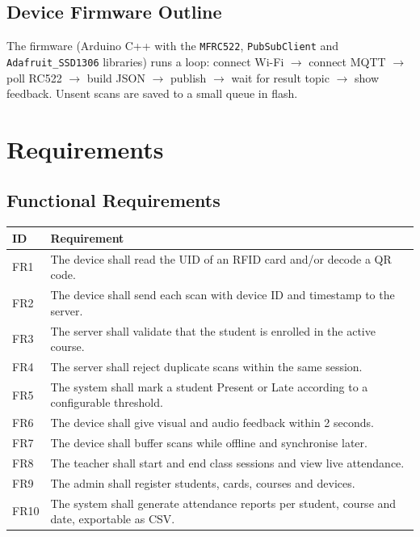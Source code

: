 \documentclass[11pt,a4paper]{article}
\begin{document}
\subsection{Device Firmware Outline}
The firmware (Arduino C++ with the \texttt{MFRC522}, \texttt{PubSubClient} and \texttt{Adafruit\_SSD1306} libraries) runs a loop: connect Wi-Fi $\rightarrow$ connect MQTT $\rightarrow$ poll RC522 $\rightarrow$ build JSON $\rightarrow$ publish $\rightarrow$ wait for result topic $\rightarrow$ show feedback. Unsent scans are saved to a small queue in flash.
 
\section{Requirements}
\subsection{Functional Requirements}
\begin{longtable}{p{1.2cm}p{13cm}}
\toprule
\textbf{ID} & \textbf{Requirement}\\
\midrule
\endhead
FR1 & The device shall read the UID of an RFID card and/or decode a QR code.\\
FR2 & The device shall send each scan with device ID and timestamp to the server.\\
FR3 & The server shall validate that the student is enrolled in the active course.\\
FR4 & The server shall reject duplicate scans within the same session.\\
FR5 & The system shall mark a student Present or Late according to a configurable threshold.\\
FR6 & The device shall give visual and audio feedback within 2 seconds.\\
FR7 & The device shall buffer scans while offline and synchronise later.\\
FR8 & The teacher shall start and end class sessions and view live attendance.\\
FR9 & The admin shall register students, cards, courses and devices.\\
FR10 & The system shall generate attendance reports per student, course and date, exportable as CSV.\\
\bottomrule
\end{longtable}
 
\end{document}

